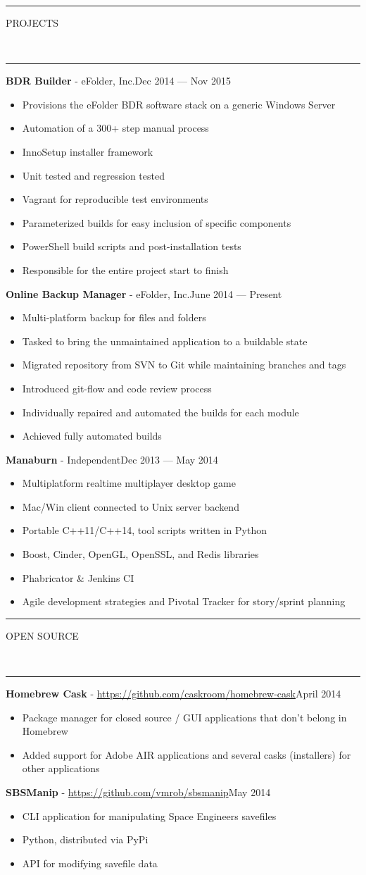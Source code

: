 \documentclass[10pt, letterpaper, oneside]{article}
\newcommand{\HRule}[2]{\textcolor{#1}{\rule{\linewidth}{#2}}}
\newcommand{\sectiontitle}[1]{\begin{minipage}{\textwidth}\HRule{black}{0.25mm}\vspace{-10pt}\begin{center}\Large\MakeUppercase{#1}\end{center}\end{minipage}\\\HRule{light-grey}{0.15mm}\vspace{\baselineskip}}
\newenvironment{ressection}[1]{
  \sectiontitle{#1}}
  {\vspace{0.5\baselineskip}}
\newenvironment{tightressection}[1]{
  \begin{minipage}{\textwidth}
  \sectiontitle{#1}}
  {\vspace{2\baselineskip}\end{minipage}}
\newcommand{\resitem}[1]{
    \vspace{2pt}
    \item \begin{flushleft} #1 \end{flushleft}
}
\newcommand{\resentryheader}[3]{
    \vspace{-5pt}
    \textbf{#1} - #2\hspace{\stretch{1}}\textcolor{light-grey}{#3}\\
}
\newenvironment{resentry}[3]{
  \begin{minipage}{\textwidth}
    \resentryheader{#1}{#2}{#3}
        \vspace{-\baselineskip}
    \begin{itemize}[noitemsep,nolistsep]
}{
    \end{itemize}
        \vspace{\baselineskip}
        \end{minipage}
}
\begin{document}
\begin{ressection}{Projects}
  \begin{resentry}{BDR Builder}{eFolder, Inc.}{Dec 2014 --- Nov 2015}
    \resitem{Provisions the eFolder BDR software stack on a generic Windows Server}
    \resitem{Automation of a 300+ step manual process}
    \resitem{InnoSetup installer framework}
    \resitem{Unit tested and regression tested}
    \resitem{Vagrant for reproducible test environments}
    \resitem{Parameterized builds for easy inclusion of specific components}
    \resitem{PowerShell build scripts and post-installation tests}
    \resitem{Responsible for the entire project start to finish}
  \end{resentry}
  \begin{resentry}{Online Backup Manager}{eFolder, Inc.}{June 2014 --- Present}
    \resitem{Multi-platform backup for files and folders}
    \resitem{Tasked to bring the unmaintained application to a buildable state}
    \resitem{Migrated repository from SVN to Git while maintaining branches and tags}
    \resitem{Introduced git-flow and code review process}
    \resitem{Individually repaired and automated the builds for each module}
    \resitem{Achieved fully automated builds}
  \end{resentry}
  \begin{resentry}{Manaburn}{Independent}{Dec 2013 --- May 2014}
    \resitem{Multiplatform realtime multiplayer desktop game}
    \resitem{Mac/Win client connected to Unix server backend}
    \resitem{Portable C++11/C++14, tool scripts written in Python}
    \resitem{Boost, Cinder, OpenGL, OpenSSL, and Redis libraries}
    \resitem{Phabricator \& Jenkins CI}
    \resitem{Agile development strategies and Pivotal Tracker for story/sprint planning}
  \end{resentry}
\end{ressection}

\begin{tightressection}{Open Source}
  \begin{resentry}{Homebrew Cask}{\href{https://github.com/caskroom/homebrew-cask/commits?author=vmrob}{https://github.com/caskroom/homebrew-cask}}{April 2014}
    \resitem{Package manager for closed source / GUI applications that don't belong in Homebrew}
    \resitem{Added support for Adobe AIR applications and several casks (installers) for other applications}
  \end{resentry}

  \begin{resentry}{SBSManip}{\href{https://github.com/vmrob/sbsmanip}{https://github.com/vmrob/sbsmanip}}{May 2014}
    \resitem{CLI application for manipulating Space Engineers savefiles}
    \resitem{Python, distributed via PyPi}
    \resitem{API for modifying savefile data}
  \end{resentry}
\end{tightressection}
\end{document}
